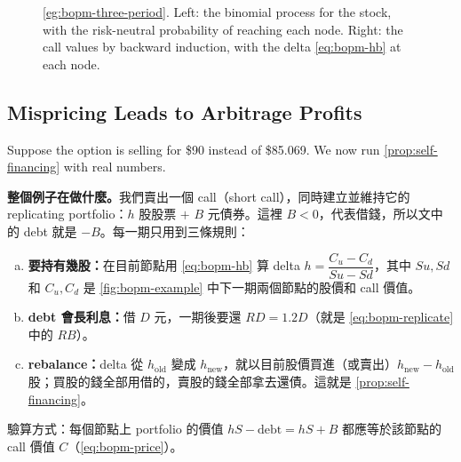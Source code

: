 \begin{figure}[H]
	\caption{\autoref{eg:bopm-three-period}. Left: the binomial process for the
		stock, with the risk-neutral probability of reaching each node. Right: the
		call values by backward induction, with the delta \eqref{eq:bopm-hb} at
		each node.}
	\label{fig:bopm-example}
\end{figure}

\subsection{Mispricing Leads to Arbitrage Profits}
\label{sec:bopm-arbitrage-walk}


Suppose the option is selling for \$90 instead of \$85.069.
\suppstart
We now run \autoref{prop:self-financing} with real numbers.
\suppend

\suppstart
\begin{remark}
	\textbf{整個例子在做什麼。}我們賣出一個 call（short call），同時建立並維持它的 replicating portfolio：$h$ 股股票 $+$ $B$ 元債券。這裡 $B<0$，代表借錢，所以文中的 debt 就是 $-B$。每一期只用到三條規則：
	\begin{enumerate}[(a),nosep]
		\item \textbf{要持有幾股：}在目前節點用 \eqref{eq:bopm-hb} 算 delta $h=\dfrac{C_{u}-C_{d}}{Su-Sd}$，其中 $Su,Sd$ 和 $C_{u},C_{d}$ 是 \autoref{fig:bopm-example} 中下一期兩個節點的股價和 call 價值。
		\item \textbf{debt 會長利息：}借 $D$ 元，一期後要還 $RD=1.2D$（就是 \eqref{eq:bopm-replicate} 中的 $RB$）。
		\item \textbf{rebalance：}delta 從 $h_{\text{old}}$ 變成 $h_{\text{new}}$，就以目前股價買進（或賣出）$h_{\text{new}}-h_{\text{old}}$ 股；買股的錢全部用借的，賣股的錢全部拿去還債。這就是 \autoref{prop:self-financing}。
	\end{enumerate}
	驗算方式：每個節點上 portfolio 的價值 $hS-\text{debt}=hS+B$ 都應等於該節點的 call 價值 $C$（\eqref{eq:bopm-price}）。
\end{remark}
\suppend

